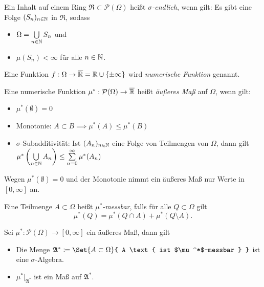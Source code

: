 \documentclass{cheat-sheet}
\newcommand{\PS}{\mathcal{P}} %
\newcommand{\PSO}{\PS(\Omega)} %
\newcommand{\Alg}{\mathfrak{A}} %
\newcommand{\Ring}{\mathfrak{R}} %
\begin{document}
\begin{defn}
  Ein Inhalt auf einem Ring $\Ring \subset \PSO$ heißt \emph{$\sigma$-endlich}, wenn gilt: Es gibt eine Folge $(S_n)_{n \in \mathbb{N}}$ in $\Ring$, sodass
  \begin{multicols}{2}
    \begin{itemize}
      \item $\Omega = \bigcup_{n \in \N} S_n$ und
      \item $\mu(S_n) < \infty$ für alle $n \in \mathbb{N}$.
    \end{itemize}
  \end{multicols}
\end{defn}

\begin{defn}
  Eine Funktion $f : \Omega \to \overline{\mathbb{R}} = \mathbb{R} \cup \{ \pm \infty \}$ wird \emph{numerische Funktion} genannt.
\end{defn}

\begin{defn}
  Eine numerische Funktion $\mu^* : \PSO \to \overline{\R}$ heißt \emph{äußeres Maß} auf $\Omega$, wenn gilt:
  \begin{itemize}
    \item $\mu^*(\emptyset) = 0$
    \item Monotonie: $A \subset B \implies \mu^*(A) \leq \mu^*(B)$
    \item $\sigma$-Subadditivität: Ist $(A_n)_{n \in \mathbb{N}}$ eine Folge von Teilmengen von $\Omega$, dann gilt $\mu^*\left(\bigcup_{n \in \N} A_n \right) \leq \sum_{n = 0}^\infty \mu^*(A_n)$
  \end{itemize}
\end{defn}

\begin{bem}
  Wegen $\mu^*(\emptyset) = 0$ und der Monotonie nimmt ein äußeres Maß nur Werte in $[0, \infty]$ an.
\end{bem}

\begin{defn}
  Eine Teilmenge $A \subset \Omega$ heißt \emph{$\mu^*$-messbar}, falls für alle $Q \subset \Omega$ gilt
  \[ \mu^*(Q) = \mu^*(Q \cap A) + \mu^*(Q \setminus A). \]
\end{defn}

\begin{satz}[Carathéodory]
  Sei $\mu^* : \PSO \to [0, \infty]$ ein äußeres Maß, dann gilt
  \begin{itemize}
    \item Die Menge $\Alg^* \coloneqq \Set{ A \subset \Omega }{ A \text{ ist $\mu^*$-messbar } }$ ist eine $\sigma$-Algebra.
    \item $\mu^*|_{\Alg^*}$ ist ein Maß auf $\Alg^*$.
  \end{itemize}
\end{satz}
\end{document}

